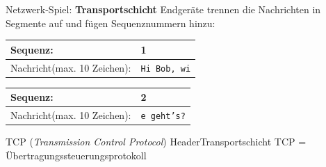 \begin{frame}{Netzwerk-Spiel: \textbf{Transportschicht}}
    Endgeräte trennen die Nachrichten in Segmente auf und fügen Sequenznummern hinzu:
    \begin{table}[H]
        \centering

        \begin{tabular}{p{2cm}|l}
            \rowcolor{\transportLayerColor!20}Sequenz:                                    & 1                   \\\midrule
            \rowcolor{\applicationLayerColor!20}Nachricht\newline\tiny (max. 10 Zeichen): & \texttt{Hi Bob, wi} \\
        \end{tabular}
        \begin{tabular}{p{2cm}|l}
            \rowcolor{\transportLayerColor!20}Sequenz:                                    & 2                  \\\midrule
            \rowcolor{\applicationLayerColor!20}Nachricht\newline\tiny (max. 10 Zeichen): & \texttt{e geht's?} \\
        \end{tabular}
    \end{table}
\end{frame}

\begin{frame}[fragile]{\faBoxOpen{} TCP (\textit{Transmission Control Protocol}) Header}{Transportschicht}
    TCP = Übertragungssteuerungsprotokoll
    \begin{table}[H]
        \centering
        
    \end{table}
\end{frame}

